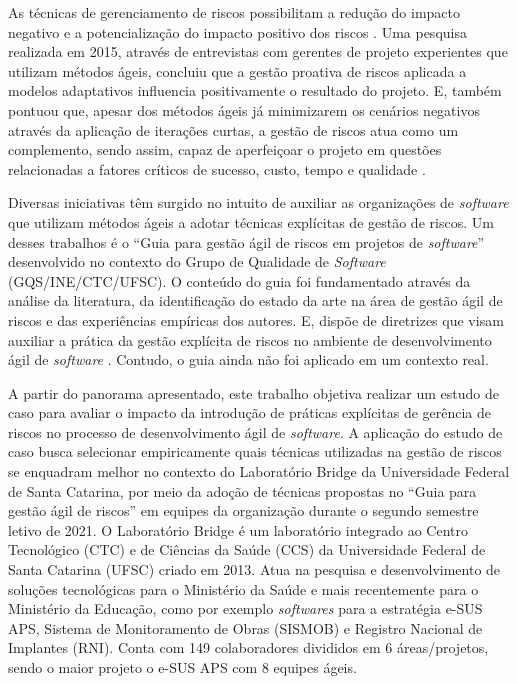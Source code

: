 \documentclass[
    12pt,       %
    openright,      %
    twoside,      %
    a4paper,      %
    english,      %
    french,       %
    spanish,      %
    brazil,       %
    ]{abntex2}
\begin{document}
As técnicas de gerenciamento de riscos possibilitam a redução do impacto negativo e a potencialização do impacto positivo dos riscos \cite{Milare:2019}. Uma pesquisa realizada em 2015, através de entrevistas com gerentes de projeto experientes que utilizam métodos ágeis, concluiu que a gestão proativa de riscos aplicada a modelos adaptativos influencia positivamente o resultado do projeto. E, também pontuou que, apesar dos métodos ágeis já minimizarem os cenários negativos através da aplicação de iterações curtas, a gestão de riscos atua como um complemento, sendo assim, capaz de aperfeiçoar o projeto em questões relacionadas a fatores críticos de sucesso, custo, tempo e qualidade \cite{Gold:2015}.

Diversas iniciativas têm surgido no intuito de auxiliar as organizações de \textit{software} que utilizam métodos ágeis a adotar técnicas explícitas de gestão de riscos. Um desses trabalhos é o “Guia para gestão ágil de riscos em projetos de \textit{software}” desenvolvido no contexto do Grupo de Qualidade de \textit{Software} (GQS/INE/CTC/UFSC). O conteúdo do guia foi fundamentado através da análise da literatura, da identificação do estado da arte na área de gestão ágil de riscos e das experiências empíricas dos autores. E, dispõe de diretrizes que visam auxiliar a prática da gestão explícita de riscos no ambiente de desenvolvimento ágil de \textit{software} \cite{Vieira:2020}. Contudo, o guia ainda não foi aplicado em um contexto real.

A partir do panorama apresentado, este trabalho objetiva realizar um estudo de caso para avaliar o impacto da introdução de práticas explícitas de gerência de riscos no processo de desenvolvimento ágil de \textit{software}. A aplicação do estudo de caso busca selecionar empiricamente quais técnicas utilizadas na gestão de riscos se enquadram melhor no contexto do Laboratório Bridge da Universidade Federal de Santa Catarina, por meio da adoção de técnicas propostas no “Guia para gestão ágil de riscos” \cite{Vieira:2020} em equipes da organização durante o segundo semestre letivo de 2021. O Laboratório Bridge é um laboratório integrado ao Centro Tecnológico (CTC) e de Ciências da Saúde (CCS) da Universidade Federal de Santa Catarina (UFSC) criado em 2013. Atua na pesquisa e desenvolvimento de soluções tecnológicas para o Ministério da Saúde e mais recentemente para o Ministério da Educação, como por exemplo \textit{softwares} para a estratégia e-SUS APS, Sistema de Monitoramento de Obras (SISMOB) e Registro Nacional de Implantes (RNI). Conta com 149 colaboradores divididos em 6 áreas/projetos, sendo o maior projeto o e-SUS APS com 8 equipes ágeis.
\end{document}
